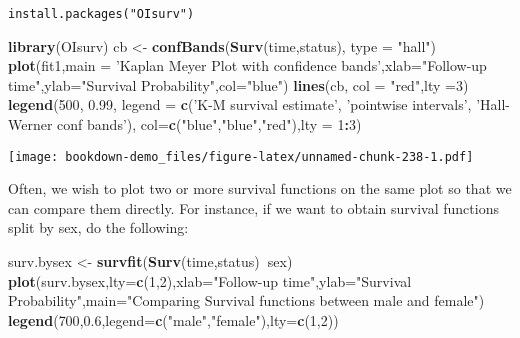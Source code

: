 \documentclass[]{book}
\newenvironment{Shaded}{\begin{snugshade}}{\end{snugshade}}
\newcommand{\KeywordTok}[1]{\textcolor[rgb]{0.13,0.29,0.53}{\textbf{#1}}}
\newcommand{\DataTypeTok}[1]{\textcolor[rgb]{0.13,0.29,0.53}{#1}}
\newcommand{\DecValTok}[1]{\textcolor[rgb]{0.00,0.00,0.81}{#1}}
\newcommand{\FloatTok}[1]{\textcolor[rgb]{0.00,0.00,0.81}{#1}}
\newcommand{\StringTok}[1]{\textcolor[rgb]{0.31,0.60,0.02}{#1}}
\newcommand{\OperatorTok}[1]{\textcolor[rgb]{0.81,0.36,0.00}{\textbf{#1}}}
\newcommand{\NormalTok}[1]{#1}
\theoremstyle{definition}
\theoremstyle{definition}
\theoremstyle{definition}
\theoremstyle{remark}
\begin{document}
\begin{verbatim}
install.packages("OIsurv")
\end{verbatim}

\begin{Shaded}
\begin{Highlighting}[]
\KeywordTok{library}\NormalTok{(OIsurv)}
\NormalTok{cb <-}\StringTok{ }\KeywordTok{confBands}\NormalTok{(}\KeywordTok{Surv}\NormalTok{(time,status), }\DataTypeTok{type =} \StringTok{"hall"}\NormalTok{)}
\KeywordTok{plot}\NormalTok{(fit1,}\DataTypeTok{main =} \StringTok{'Kaplan Meyer Plot with confidence bands'}\NormalTok{,}\DataTypeTok{xlab=}\StringTok{"Follow-up time"}\NormalTok{,}\DataTypeTok{ylab=}\StringTok{"Survival Probability"}\NormalTok{,}\DataTypeTok{col=}\StringTok{"blue"}\NormalTok{)}
\KeywordTok{lines}\NormalTok{(cb, }\DataTypeTok{col =} \StringTok{"red"}\NormalTok{,}\DataTypeTok{lty =}\DecValTok{3}\NormalTok{)}
\KeywordTok{legend}\NormalTok{(}\DecValTok{500}\NormalTok{, }\FloatTok{0.99}\NormalTok{, }\DataTypeTok{legend =} \KeywordTok{c}\NormalTok{(}\StringTok{'K-M survival estimate'}\NormalTok{,}
\StringTok{'pointwise intervals'}\NormalTok{, }\StringTok{'Hall-Werner conf bands'}\NormalTok{), }\DataTypeTok{col=}\KeywordTok{c}\NormalTok{(}\StringTok{"blue"}\NormalTok{,}\StringTok{"blue"}\NormalTok{,}\StringTok{"red"}\NormalTok{),}\DataTypeTok{lty =} \DecValTok{1}\OperatorTok{:}\DecValTok{3}\NormalTok{)}
\end{Highlighting}
\end{Shaded}

\texttt{[image: bookdown-demo\_files/figure-latex/unnamed-chunk-238-1.pdf]}

Often, we wish to plot two or more survival functions on the same plot
so that we can compare them directly. For instance, if we want to obtain
survival functions split by sex, do the following:

\begin{Shaded}
\begin{Highlighting}[]
\NormalTok{surv.bysex <-}\StringTok{ }\KeywordTok{survfit}\NormalTok{(}\KeywordTok{Surv}\NormalTok{(time,status)}\OperatorTok{~}\NormalTok{sex)}
\KeywordTok{plot}\NormalTok{(surv.bysex,}\DataTypeTok{lty=}\KeywordTok{c}\NormalTok{(}\DecValTok{1}\NormalTok{,}\DecValTok{2}\NormalTok{),}\DataTypeTok{xlab=}\StringTok{"Follow-up time"}\NormalTok{,}\DataTypeTok{ylab=}\StringTok{"Survival Probability"}\NormalTok{,}\DataTypeTok{main=}\StringTok{"Comparing Survival functions between male and female"}\NormalTok{)}
\KeywordTok{legend}\NormalTok{(}\DecValTok{700}\NormalTok{,}\FloatTok{0.6}\NormalTok{,}\DataTypeTok{legend=}\KeywordTok{c}\NormalTok{(}\StringTok{"male"}\NormalTok{,}\StringTok{"female"}\NormalTok{),}\DataTypeTok{lty=}\KeywordTok{c}\NormalTok{(}\DecValTok{1}\NormalTok{,}\DecValTok{2}\NormalTok{))}
\end{Highlighting}
\end{Shaded}
\end{document}
